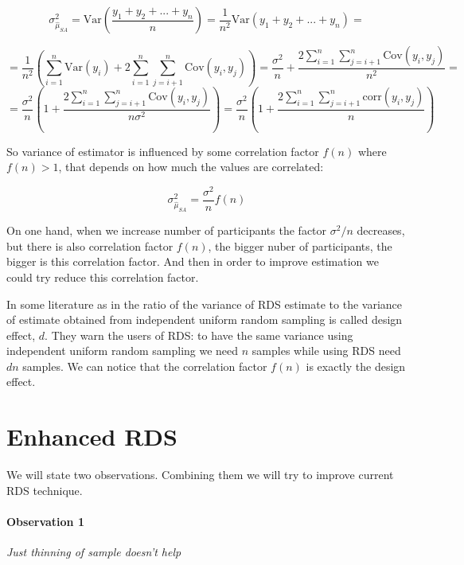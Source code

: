 \documentclass[12pt]{report}
\begin{document}
$$ \sigma^2_{\hat{\mu}_{SA}} = \mathrm{Var}\left( \frac{y_1 + y_2 + ... + y_n}{n}\right)=\frac{1}{n^2} \mathrm{Var}(y_1 + y_2 + ... + y_n) =$$

$$= \frac{1}{n^2} \left(\sum_{i = 1}^n \mathrm{Var}(y_i) + 2\sum_{i=1}^n \sum_{j=i+1}^n \mathrm{Cov}(y_i, y_j)\right)= \frac{\sigma^2}{n} + \frac{2\sum_{i=1}^n \sum_{j=i+1}^n \mathrm{Cov}(y_i, y_j)}{n^2} = $$
$$ = \frac{\sigma^2}{n} \left(1 + \frac{2\sum_{i=1}^n \sum_{j=i+1}^n \mathrm{Cov}(y_i, y_j)}{n\sigma^2}\right) = \frac{\sigma^2}{n} \left(1 + \frac{2\sum_{i=1}^n \sum_{j=i+1}^n \mathrm{corr}(y_i, y_j)}{n}\right)$$

So variance of estimator is influenced by some correlation factor $f(n)$ where$f(n) > 1$, that depends on how much the values are correlated:

$$ \sigma^2_{\hat{\mu}_{SA}} = \frac{\sigma^2}{n} f(n)$$

On one hand, when we increase number of participants the factor $\sigma^2/n$ decreases, but there is also correlation factor $f(n)$, the bigger nuber of participants, the bigger is this correlation factor. And then in order to improve estimation we could try reduce this correlation factor.

In some literature as in  \cite{goel2010assessing} the ratio of the variance of RDS estimate to the variance of estimate obtained from independent uniform random sampling is called design effect, $d$. They warn the users of RDS: to have the same variance using independent uniform random sampling we need $n$ samples while using RDS need $dn$ samples. We can notice that the correlation factor $f(n)$ is exactly the design effect.



\section{Enhanced RDS}
\label{sec:Enhanced RDS}


We will state two observations. Combining them we will try to improve current RDS technique.


\paragraph{Observation 1} \textit{Just thinning of sample doesn't help}
\end{document}
